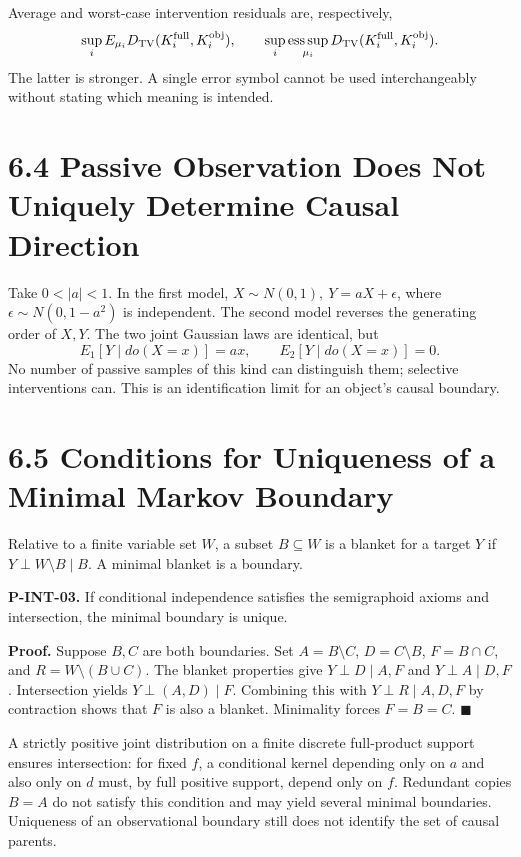 \documentclass[
  english,
  11pt,
  oneside]{book}
\begin{document}
Average and worst-case intervention residuals are, respectively, \[\sup_i E_{\mu_i}D_{\rm TV}(K_i^{\rm full},K_i^{\rm obj}),
\qquad
\sup_i\operatorname*{ess\,sup}_{\mu_i}
D_{\rm TV}(K_i^{\rm full},K_i^{\rm obj}).\] The latter is stronger. A single error symbol cannot be used interchangeably without stating which meaning is intended.

\section{6.4 Passive Observation Does Not Uniquely Determine Causal Direction}\label{passive-observation-does-not-uniquely-determine-causal-direction}

Take \(0<|a|<1\). In the first model, \(X\sim N(0,1),\ Y=aX+\epsilon\), where \(\epsilon\sim N(0,1-a^2)\) is independent. The second model reverses the generating order of \(X,Y\). The two joint Gaussian laws are identical, but \[E_1[Y\mid do(X=x)]=ax,\qquad
E_2[Y\mid do(X=x)]=0.\] No number of passive samples of this kind can distinguish them; selective interventions can. This is an identification limit for an object's causal boundary.

\section{6.5 Conditions for Uniqueness of a Minimal Markov Boundary}\label{conditions-for-uniqueness-of-a-minimal-markov-boundary}

Relative to a finite variable set \(W\), a subset \(B\subseteq W\) is a blanket for a target \(Y\) if \(Y\perp W\setminus B\mid B\). A minimal blanket is a boundary.

\hypertarget{p-int-03}{}\label{p-int-03}

\textbf{P-INT-03.} If conditional independence satisfies the semigraphoid axioms and intersection, the minimal boundary is unique.

\textbf{Proof.} Suppose \(B,C\) are both boundaries. Set \(A=B\setminus C\), \(D=C\setminus B\), \(F=B\cap C\), and \(R=W\setminus(B\cup C)\). The blanket properties give \(Y\perp D\mid A,F\) and \(Y\perp A\mid D,F\). Intersection yields \(Y\perp(A,D)\mid F\). Combining this with \(Y\perp R\mid A,D,F\) by contraction shows that \(F\) is also a blanket. Minimality forces \(F=B=C\). \(\blacksquare\)

A strictly positive joint distribution on a finite discrete full-product support ensures intersection: for fixed \(f\), a conditional kernel depending only on \(a\) and also only on \(d\) must, by full positive support, depend only on \(f\). Redundant copies \(B=A\) do not satisfy this condition and may yield several minimal boundaries. Uniqueness of an observational boundary still does not identify the set of causal parents.
\end{document}
